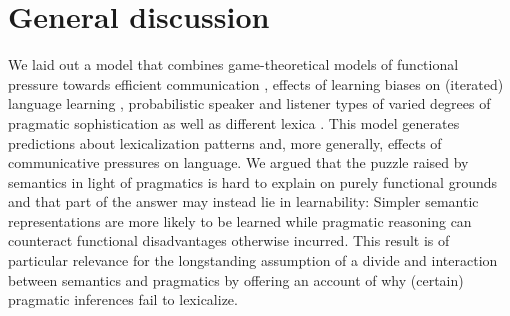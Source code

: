 \documentclass[a4paper]{article}
\begin{document}
\section{General discussion}
We laid out a model that combines game-theoretical models of functional pressure towards efficient communication \citep{nowak+krakauer:1999}, effects of learning biases on (iterated) language learning \citep{griffiths+kalish:2007}, probabilistic speaker and listener types of varied degrees of pragmatic sophistication \citep{frank+goodman:2012, franke+jaeger:2014} as well as different lexica \citep{bergen+etal:2012,bergen+etal:2016}. This model generates predictions about lexicalization patterns and, more generally, effects of communicative pressures on language. We argued that the puzzle raised by semantics in light of pragmatics is hard to explain on purely functional grounds and that part of the answer may instead lie in learnability: Simpler semantic representations are more likely to be learned while pragmatic reasoning can counteract functional disadvantages otherwise incurred. This result is of particular relevance for the longstanding assumption of a divide and interaction between semantics and pragmatics by offering an account of why (certain) pragmatic inferences fail to lexicalize.
\end{document}
